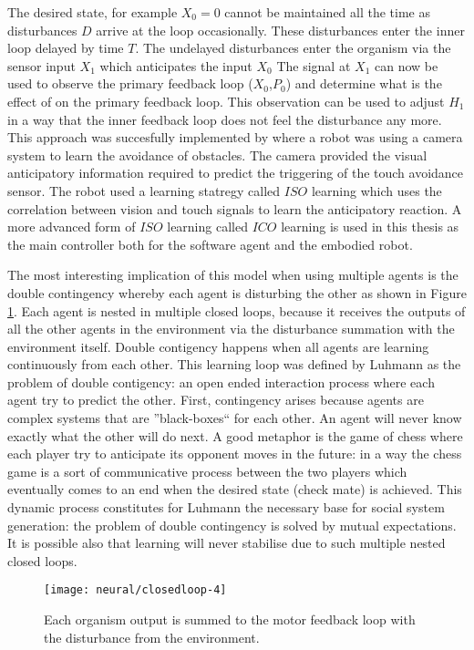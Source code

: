 The desired state, for example $X_0=0$ cannot be maintained all the time
as disturbances $D$ arrive at the loop occasionally. These disturbances enter
the inner loop delayed by time $T$. The undelayed disturbances enter the organism
via the sensor input $X_1$ which anticipates the input $X_0$ The signal at $X_1$
can now be used to observe the primary feedback loop ($X_0$,$P_0$) and determine 
what is the effect of on the primary feedback loop. This observation can be used to adjust
$H_1$ in a way that the inner feedback loop does not feel the disturbance any more.
This approach was succesfully implemented by \citet{Porr2003b} where a 
robot was using a camera system to learn the avoidance of obstacles.
The camera provided the visual anticipatory information required to predict the 
triggering of the touch avoidance sensor.
The robot used a learning statregy called $ISO$ learning which uses the correlation between
 vision and touch signals to learn the anticipatory reaction.
A more advanced form of $ISO$ learning called $ICO$ learning is used in this thesis as the main controller
 both for the software agent and the embodied robot.

The most interesting implication of this model when using multiple agents is the 
double contingency whereby each agent is disturbing the other as shown in Figure 
\ref{Fig:Neural:MutualDisturbance}.
Each agent is nested in multiple closed loops, because it receives the outputs of 
all the other agents in the environment via the disturbance summation with the 
environment itself.
Double contigency happens when all agents are learning continuously from each other.
This learning loop was defined by Luhmann as the problem of double contigency:
an open ended interaction process where each agent try to predict the other.
First, contingency arises because agents are complex systems that are ''black-boxes``
 for each other. An agent will never know exactly what the other will do next.
A good metaphor is the game of chess where each player try to anticipate its opponent 
moves in the future: in a way the chess game is a sort of communicative process between
the two players which eventually comes to an end when the desired state (check mate) 
is achieved.
This dynamic process constitutes for Luhmann the necessary base for social system generation:
the problem of double contingency is solved by mutual expectations.
It is possible also that learning will never stabilise due to such multiple nested
 closed loops.

\begin{figure}[htbp]
\begin{center}
\texttt{[image: neural/closedloop-4]}
\end{center}
\small{
\caption[Double contigency]{
Each organism output is summed to the motor feedback loop with the 
disturbance from the environment.
\label{Fig:Neural:MutualDisturbance}}}
\end{figure} 

